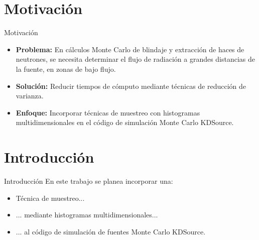 \documentclass[aspectratio=169,english]{beamer}
\begin{document}








\section{Motivación}
\begin{frame}{Motivación}
    \begin{itemize}[itemsep=1.5em]
        \item \textbf{Problema:} En cálculos Monte Carlo de blindaje y extracción de haces de neutrones, se necesita determinar el flujo de radiación a grandes distancias de la fuente, en zonas de bajo flujo.
        \item \textbf{Solución:} Reducir tiempos de cómputo mediante técnicas de reducción de varianza.
        \item \textbf{Enfoque:} Incorporar técnicas de muestreo con histogramas multidimensionales en el código de simulación Monte Carlo KDSource.
    \end{itemize}
\end{frame}


\section{Introducción}
\begin{frame}{Introducción}
    En este trabajo se planea incorporar una:
    \begin{itemize}[itemsep=1.5em]
        \item Técnica de muestreo...
        \item ... mediante histogramas multidimensionales...
        \item ... al código de simulación de fuentes Monte Carlo KDSource.
    \end{itemize}
\end{frame}
\end{document}
